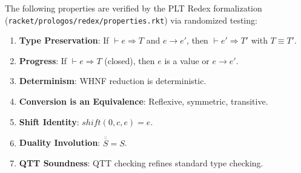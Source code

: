 \documentclass[11pt]{article}
\begin{document}
The following properties are verified by the PLT Redex formalization
(\texttt{racket/prologos/redex/properties.rkt}) via randomized testing:

\begin{enumerate}
  \item \textbf{Type Preservation}: If $\vdash e \Rightarrow T$ and $e \to e'$,
        then $\vdash e' \Rightarrow T'$ with $T \equiv T'$.
  \item \textbf{Progress}: If $\vdash e \Rightarrow T$ (closed), then $e$ is a
        value or $e \to e'$.
  \item \textbf{Determinism}: WHNF reduction is deterministic.
  \item \textbf{Conversion is an Equivalence}: Reflexive, symmetric, transitive.
  \item \textbf{Shift Identity}: $\mathit{shift}(0, c, e) = e$.
  \item \textbf{Duality Involution}: $\overline{\overline{S}} = S$.
  \item \textbf{QTT Soundness}: QTT checking refines standard type checking.
\end{enumerate}
\end{document}
